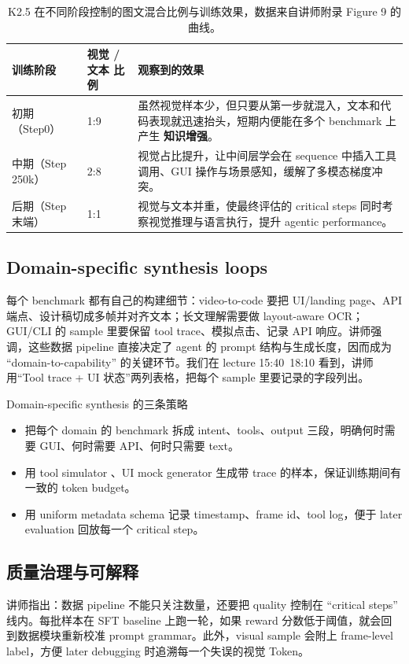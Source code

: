 \begin{table}[H]
\footnotesize
\centering
\begin{tabular}{p{3cm}p{4cm}p{7cm}}
\toprule
训练阶段 & 视觉 / 文本 比例 & 观察到的效果 \\
\midrule
初期（Step0） & 1:9 & 虽然视觉样本少，但只要从第一步就混入，文本和代码表现就迅速抬头，短期内便能在多个 benchmark 上产生 \textbf{知识增强}。 \\
中期（Step 250k） & 2:8 & 视觉占比提升，让中间层学会在 sequence 中插入工具调用、GUI 操作与场景感知，缓解了多模态梯度冲突。 \\
后期（Step 末端） & 1:1 & 视觉与文本并重，使最终评估的 critical steps 同时考察视觉推理与语言执行，提升 agentic performance。 \\
\bottomrule
\end{tabular}
\caption{K2.5 在不同阶段控制的图文混合比例与训练效果，数据来自讲师附录 Figure 9 的曲线。}
\end{table}

\subsection{Domain-specific synthesis loops}
每个 benchmark 都有自己的构建细节：video-to-code 要把 UI/landing page、API 端点、设计稿切成多帧并对齐文本；长文理解需要做 layout-aware OCR；GUI/CLI 的 sample 里要保留 tool trace、模拟点击、记录 API 响应。讲师强调，这些数据 pipeline 直接决定了 agent 的 prompt 结构与生成长度，因而成为 ``domain-to-capability'' 的关键环节。我们在 lecture 15:40~18:10 看到，讲师用``Tool trace + UI 状态''两列表格，把每个 sample 里要记录的字段列出。

\begin{knowledgebox}{Domain-specific synthesis 的三条策略}
\begin{itemize}
    \item 把每个 domain 的 benchmark 拆成 intent、tools、output 三段，明确何时需要 GUI、何时需要 API、何时只需要 text。
    \item 用 tool simulator 、UI mock generator 生成带 trace 的样本，保证训练期间有一致的 token budget。
    \item 用 uniform metadata schema 记录 timestamp、frame id、tool log，便于 later evaluation 回放每一个 critical step。
\end{itemize}
\end{knowledgebox}

\subsection{质量治理与可解释}
讲师指出：数据 pipeline 不能只关注数量，还要把 quality 控制在 ``critical steps'' 线内。每批样本在 SFT baseline 上跑一轮，如果 reward 分数低于阈值，就会回到数据模块重新校准 prompt grammar。此外，visual sample 会附上 frame-level label，方便 later debugging 时追溯每一个失误的视觉 Token。

